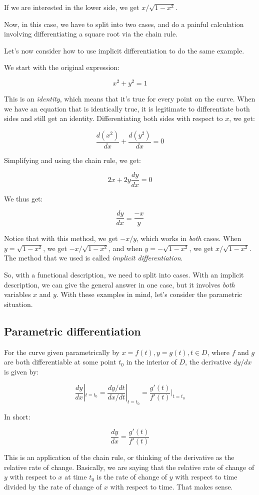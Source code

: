 \documentclass[10pt]{amsart}
\begin{document}
If we are interested in the lower side, we get $x/\sqrt{1 - x^2}$.

Now, in this case, we have to split into two cases, and do a painful
calculation involving differentiating a square root via the chain rule.

Let's now consider how to use implicit differentiation to do the same example.

We start with the original expression:

$$x^2 + y^2 = 1$$

This is an {\em identity}, which means that it's true for every point
on the curve. When we have an equation that is identically true, it is
legitimate to differentiate both sides and still get an
identity. Differentiating both sides with respect to $x$, we get:

$$\frac{d(x^2)}{dx} + \frac{d(y^2)}{dx} = 0$$

Simplifying and using the chain rule, we get:

$$2x + 2y\frac{dy}{dx} = 0$$

We thus get:

$$\frac{dy}{dx} = \frac{-x}{y}$$

Notice that with this method, we get $-x/y$, which works in {\em both}
cases. When $y = \sqrt{1 - x^2}$, we get $-x/\sqrt{1 - x^2}$, and when
$y = -\sqrt{1 - x^2}$, we get $x/\sqrt{1 - x^2}$. The method that we
used is called {\em implicit differentiation}.

So, with a functional description, we need to split into cases. With
an implicit description, we can give the general answer in one case,
but it involves {\em both} variables $x$ and $y$. With these examples
in mind, let's consider the parametric situation.

\subsection{Parametric differentiation}

For the curve given parametrically by $x = f(t), y = g(t), t \in D$,
where $f$ and $g$ are both differentiable at some point $t_0$ in the
interior of $D$, the derivative $dy/dx$ is given by:

$$\frac{dy}{dx}|_{t = t_0} = \frac{dy/dt}{dx/dt}|_{t = t_0} = \frac{g'(t)}{f'(t)}|_{t = t_0}$$

In short:

$$\frac{dy}{dx} = \frac{g'(t)}{f'(t)}$$

This is an application of the chain rule, or thinking of the
derivative as the relative rate of change. Basically, we are saying
that the relative rate of change of $y$ with respect to $x$ at time
$t_0$ is the rate of change of $y$ with respect to time divided by the
rate of change of $x$ with respect to time. That makes sense.
\end{document}
